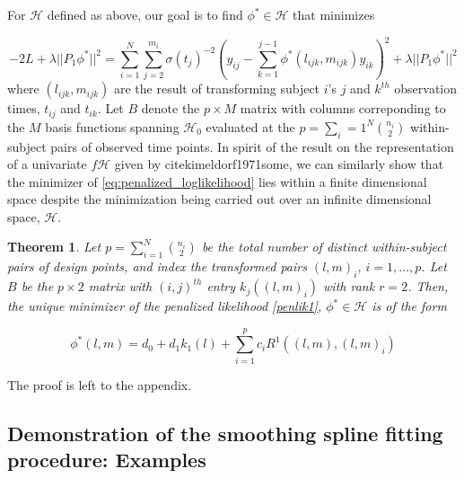 \documentclass[12pt]{article}
\newtheorem{theorem}{Theorem}[section]
\theoremstyle{definition}
\begin{document}
For $\mathcal{H}$ defined as above, our goal is to find $\phi^* \in \mathcal{H}$  that minimizes 

\begin{equation} \label{eq:penalized_loglikelihood}
-2L + \lambda \vert \vert P_1 \phi^* \vert \vert^2 =  \sum_{i=1}^N \sum_{j=2}^{m_i} \sigma\left({t_j}\right)^{-2} \left(y_{ij} - \sum_{k=1}^{j-1}\phi^*\left({l_{ijk},m_{ijk}}\right)y_{ik} \right)^2 + \lambda  \vert \vert P_1 \phi^* \vert \vert^2
\end{equation}
\noindent
where $\left(l_{ijk}, m_{ijk}\right)$ are the result of transforming subject $i$'s $j$ and $k^{th}$ observation times, $t_{ij}$ and $t_{ik}$.  Let  $B$ denote the $p \times M$  matrix  with columns correponding to the $M$ basis functions spanning $\mathcal{H}_0$ evaluated at the $p = \sum_i=1^N {n_i \choose 2}$ within-subject pairs of observed time points.  In spirit of the result on the representation of a univariate $f \mathcal{H}$ given by cite{kimeldorf1971some}, we can similarly show that the minimizer of \ref{eq:penalized_loglikelihood} lies within a finite dimensional space despite the minimization being carried out over an infinite dimensional space, $\mathcal{H}$. 

\begin{theorem} \label{phi_representer_thm}
Let $p= \sum_{i=1}^N {n_i \choose 2}$ be the total number of distinct within-subject pairs of design points, and index the transformed pairs $\left( l,m \right)_i$, $i=1, \dots,p$. Let $B$ be the $p \times 2$ matrix with $\left(i,j\right)^{th}$ entry $k_j\left( \left( l,m \right)_i \right)$ with rank $r=2$. Then, the unique minimizer of the penalized likelihood \eqref{penlik1}, $\phi^* \in \mathcal{H}$ is of the form

\begin{equation}
\phi^*\left(l,m\right) = d_0 + d_1 k_1\left(l\right) + \sum_{i=1}^{p} c_i R^1\left( \left(l,m\right) , \left(l,m \right)_i\right)
 \label{eq:finitedimsolution}
\end{equation}
\end{theorem}

The proof is left to the appendix. 

\subsection{Demonstration of the smoothing spline fitting procedure: Examples}
\end{document}
